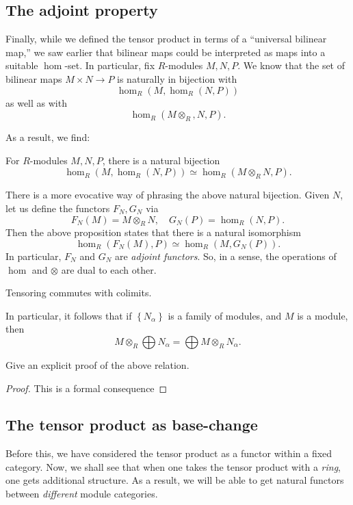 \subsection{The adjoint property}
Finally, while we defined the tensor product in terms of a ``universal
bilinear map,'' we saw earlier that bilinear maps could be interpreted as maps
into a suitable $\hom$-set.
In particular, fix $R$-modules $M,N,P$. We know that the set of bilinear maps
$M \times N \to P$ is naturally in bijection with
\[ \hom_R(M, \hom_R(N,P))  \]
as well as with
\[ \hom_R(M \otimes_R, N, P).  \]

As a result, we find:
\begin{proposition} For $R$-modules $M,N,P$, there is a natural bijection
\[ \hom_R(M,\hom_R(N,P)) \simeq \hom_R(M \otimes_R N, P).   \]
\end{proposition}

There is a more evocative way of phrasing the above natural bijection. Given
$N$, let us define the functors $F_N, G_N$ via
\[ F_N(M) = M \otimes_R N, \quad G_N(P) = \hom_R(N,P).  \]
Then the above proposition states that there is a natural isomorphism
\[ \hom_R( F_N(M), P) \simeq \hom_R( M, G_N(P)).  \]
In particular, $F_N$ and $G_N$ are \emph{adjoint functors}. So, in a sense,
the operations of $\hom$ and $\otimes$ are dual to each other.

\begin{proposition}
Tensoring commutes with colimits.
\end{proposition}

In particular, it follows that if $\left\{N_\alpha\right\}$ is a family of
modules, and $M$ is a module, then
\[ M \otimes_R \bigoplus N_\alpha = \bigoplus M \otimes_R N_\alpha.  \]
\begin{exercise}
Give an explicit proof of the above relation.
\end{exercise}

\begin{proof}
This is a formal consequence
\end{proof}

\subsection{The tensor product as base-change}

Before this, we have considered the tensor product as a functor within a
fixed category. Now, we shall see that when one takes the tensor product with a
\emph{ring}, one gets additional structure. As a result, we will be able to
get natural functors between  \emph{different} module categories.

